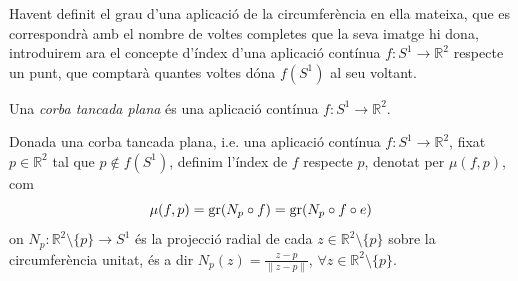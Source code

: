 \documentclass[../main.tex]{subfiles}
\begin{document}
Havent definit el grau d'una aplicació de la circumferència en ella mateixa, que es correspondrà amb el nombre de voltes completes que la seva imatge hi dona, introduirem ara el concepte d'índex d'una aplicació contínua $f:S^1\rightarrow \mathbb{R}^2$ respecte un punt, que comptarà quantes voltes dóna $f(S^1)$ al seu voltant.


\begin{defi}
[Corba]\label{def:corba} Una \textit{corba tancada plana} és una aplicació contínua $f:S^1\rightarrow \mathbb{R}^2$.
\end{defi}

\begin{defi}
\label{def:indexcorbapunt} Donada una corba tancada plana, i.e. una aplicació contínua $f:S^1\rightarrow \mathbb{R}^2$, fixat $p\in\mathbb{R}^2$ tal que $p\not\in f(S^1)$, definim l'índex de $f$ respecte $p$, denotat per $\mu(f,p)$, com
\begin{equation}
    \notag
    \mu(f,p) = \mathrm{gr}(N_p\circ f) = \mathrm{gr}(N_p\circ f\circ e)
\end{equation}
on $N_p:\mathbb{R}^2\setminus\{p\}\rightarrow S^1$ és la projecció radial de cada $z\in \mathbb{R}^2\setminus\{p\}$ sobre la circumferència unitat, és a dir $N_p(z) = \frac{z-p}{\|z-p\|}$, $\forall z\in\mathbb{R}^2\setminus\{p\}$.
\end{defi}
\end{document}
